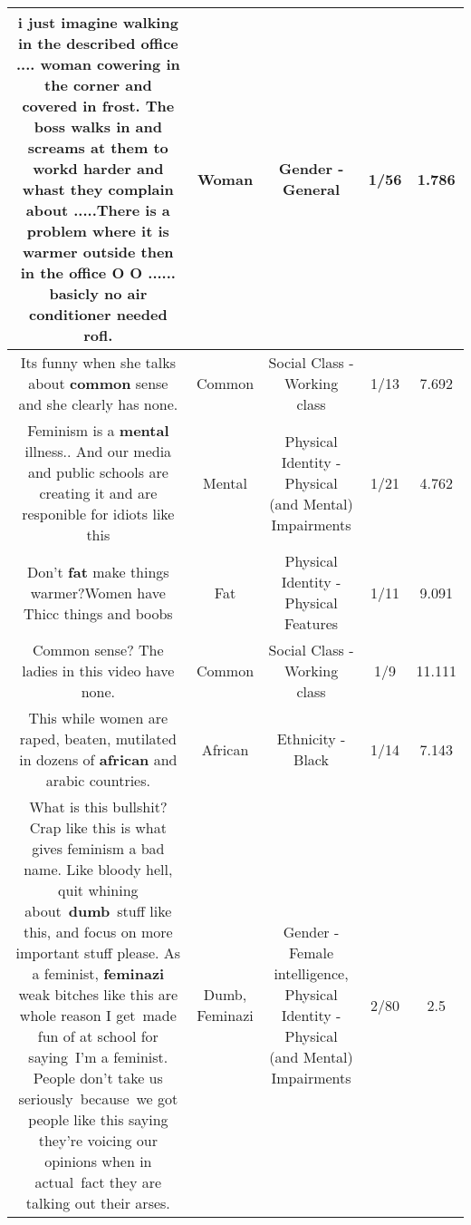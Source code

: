 \documentclass[11pt]{article}
\newlength\mylength
\begin{document}
\begin{center}
\begin{longtable}{|C{.65\mylength}|C{.30\mylength}|C{.12\mylength}|C{.12\mylength}|C{.12\mylength}|}
  \small i just imagine walking in the described office .... \textbf{woman} cowering in the corner and covered in frost. The boss walks in and screams at them to workd harder and whast they complain about .....There is a problem where it is warmer outside then in the office O O ...... basicly no air conditioner needed rofl.\normalsize   & Woman & Gender - General & 1/56 & 1.786 \\  \hline
  \small Its funny when she talks about \textbf{common} sense and she clearly has none.\normalsize   & Common & Social Class - Working class & 1/13 & 7.692 \\  \hline
  \small Feminism is a \textbf{mental} illness.. And our media and public schools are creating it and are responible for idiots like this\normalsize   & Mental & Physical Identity - Physical (and Mental) Impairments & 1/21 & 4.762 \\  \hline
  \small Don't \textbf{fat} make things warmer?Women have Thicc things and boobs\normalsize   & Fat & Physical Identity - Physical Features & 1/11 & 9.091 \\  \hline
  \small Common sense? The ladies in this video have none.\normalsize   & Common & Social Class - Working class & 1/9 & 11.111 \\  \hline
  \small This while women are raped, beaten, mutilated in dozens of \textbf{african} and arabic countries.\normalsize   & African & Ethnicity - Black & 1/14 & 7.143 \\  \hline
  \small What is this bullshit? Crap like this is what gives feminism a bad name. Like bloody hell, quit whining about \textbf{dumb} stuff like this, and focus on more important stuff please. As a feminist, \textbf{feminazi} weak bitches like this are whole reason I get made fun of at school for saying I'm a feminist. People don't take us seriously because we got people like this saying they're voicing our opinions when in actual fact they are talking out their arses.\normalsize   & Dumb, Feminazi & Gender - Female intelligence, Physical Identity - Physical (and Mental) Impairments & 2/80 & 2.5 \\  \hline

\end{longtable}
\end{center}
\end{document}
